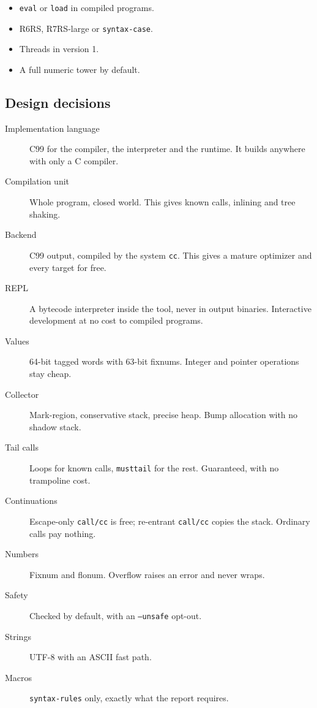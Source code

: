 \documentclass[a4paper,11pt]{article}
\begin{document}
\begin{itemize}
\item \texttt{eval} or \texttt{load} in compiled programs.
\item R6RS, R7RS-large or \texttt{syntax-case}.
\item Threads in version 1.
\item A full numeric tower by default.
\end{itemize}

\subsection{Design decisions}

\begin{description}
\item[Implementation language] C99 for the compiler, the interpreter and
  the runtime. It builds anywhere with only a C compiler.
\item[Compilation unit] Whole program, closed world. This gives known
  calls, inlining and tree shaking.
\item[Backend] C99 output, compiled by the system \texttt{cc}. This gives a
  mature optimizer and every target for free.
\item[REPL] A bytecode interpreter inside the tool, never in output
  binaries. Interactive development at no cost to compiled programs.
\item[Values] 64-bit tagged words with 63-bit fixnums. Integer and pointer
  operations stay cheap.
\item[Collector] Mark-region, conservative stack, precise heap. Bump
  allocation with no shadow stack.
\item[Tail calls] Loops for known calls, \texttt{musttail} for the rest.
  Guaranteed, with no trampoline cost.
\item[Continuations] Escape-only \texttt{call/cc} is free; re-entrant
  \texttt{call/cc} copies the stack. Ordinary calls pay nothing.
\item[Numbers] Fixnum and flonum. Overflow raises an error and never wraps.
\item[Safety] Checked by default, with an \texttt{--unsafe} opt-out.
\item[Strings] UTF-8 with an ASCII fast path.
\item[Macros] \texttt{syntax-rules} only, exactly what the report requires.
\end{description}

\end{document}
